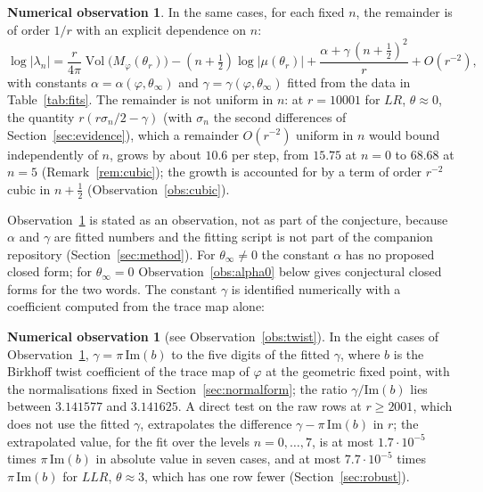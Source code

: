 \documentclass[11pt]{amsart}
\theoremstyle{definition}
\newtheorem{observation}[conjecture]{Numerical observation}
\theoremstyle{remark}
\newcommand{\Vol}{\operatorname{Vol}}
\begin{document}
\begin{observation}\label{obs:subleading}
In the same cases, for each fixed $n$, the remainder is of order $1/r$ with an explicit
dependence on $n$:
\[
\log|\lambda_n| = \frac{r}{4\pi}\Vol\big(M_\varphi(\theta_r)\big)
- \left(n + \tfrac12\right)\log|\mu(\theta_r)|
+ \frac{\alpha + \gamma\,(n+\frac12)^2}{r} + O(r^{-2}),
\]
with constants $\alpha = \alpha(\varphi, \theta_\infty)$ and
$\gamma = \gamma(\varphi, \theta_\infty)$ fitted from the data in
Table~\ref{tab:fits}. The remainder is not uniform in $n$: at $r = 10001$ for $LR$,
$\theta \approx 0$, the quantity $r(r\sigma_n/2 - \gamma)$ (with $\sigma_n$ the
second differences of Section~\ref{sec:evidence}), which a remainder $O(r^{-2})$
uniform in $n$ would bound independently of $n$, grows by about $10.6$ per step, from
$15.75$ at $n = 0$ to $68.68$ at $n = 5$ (Remark~\ref{rem:cubic}); the growth is
accounted for by a term of order $r^{-2}$ cubic in $n+\frac12$
(Observation~\ref{obs:cubic}).
\end{observation}

Observation~\ref{obs:subleading} is stated as an observation, not as part of the
conjecture, because $\alpha$ and $\gamma$ are fitted numbers and the fitting script
is not part of the companion repository (Section~\ref{sec:method}). For
$\theta_\infty \ne 0$ the constant $\alpha$ has no proposed closed form; for
$\theta_\infty = 0$ Observation~\ref{obs:alpha0} below gives conjectural closed forms
for the two words. The constant $\gamma$ is identified numerically
with a coefficient computed from the trace map alone:

\begin{observation}[see Observation~\ref{obs:twist}]\label{obs:gamma}
In the eight cases of Observation~\ref{obs:subleading},
$\gamma = \pi\,\mathrm{Im}(b)$ to the five digits of the fitted $\gamma$, where $b$ is
the Birkhoff twist coefficient of the trace map of $\varphi$ at the geometric fixed
point, with the normalisations fixed in Section~\ref{sec:normalform}; the ratio
$\gamma/\mathrm{Im}(b)$ lies between $3.141577$ and $3.141625$. A direct test on the
raw rows at $r \ge 2001$, which does not use the fitted $\gamma$, extrapolates the
difference $\gamma - \pi\,\mathrm{Im}(b)$ in $r$; the extrapolated value, for the fit over the levels $n = 0, \dots, 7$, is at most
$1.7\cdot10^{-5}$ times $\pi\,\mathrm{Im}(b)$ in absolute value in seven cases, and at
most $7.7\cdot10^{-5}$ times $\pi\,\mathrm{Im}(b)$ for $LLR$, $\theta \approx 3$,
which has one row fewer (Section~\ref{sec:robust}).
\end{observation}
\end{document}
